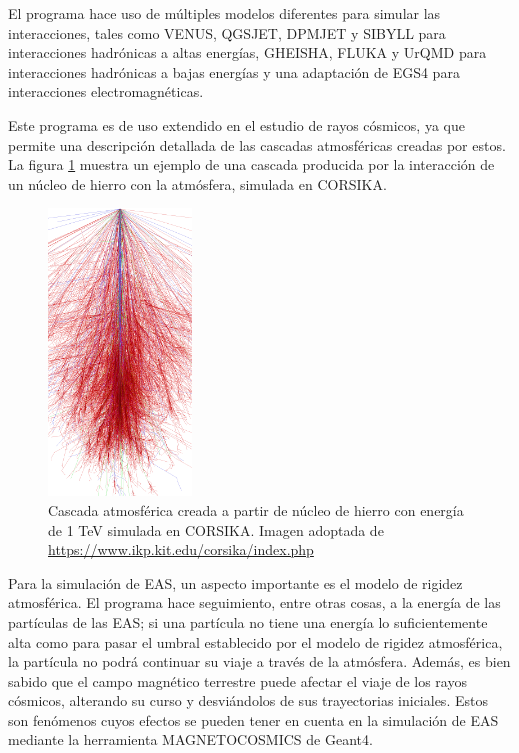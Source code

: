 \documentclass[12pt]{report}
\begin{document}
El programa hace uso de múltiples modelos diferentes para simular las interacciones, tales como VENUS, QGSJET, DPMJET y SIBYLL para interacciones hadrónicas a altas energías, GHEISHA, FLUKA y UrQMD para interacciones hadrónicas a bajas energías y una adaptación de EGS4 para interacciones electromagnéticas. \cite{heck1998corsika}

Este programa es de uso extendido en el estudio de rayos cósmicos, ya que permite una descripción detallada de las cascadas atmosféricas creadas por estos. La figura \ref{fig:ironcascade} muestra un ejemplo de una cascada producida por la interacción de un núcleo de hierro con la atmósfera, simulada en CORSIKA.

\begin{figure}
    \centering
    \includegraphics[width=1.5in]{images/ironcascade.png}
    \caption{Cascada atmosférica creada a partir de núcleo de hierro con energía de 1 TeV simulada en CORSIKA. Imagen adoptada de \url{https://www.ikp.kit.edu/corsika/index.php}}
    \label{fig:ironcascade}
\end{figure}

Para la simulación de EAS, un aspecto importante es el modelo de rigidez atmosférica. El programa hace seguimiento, entre otras cosas, a la energía de las partículas de las EAS; si una partícula no tiene una energía lo suficientemente alta como para pasar el umbral establecido por el modelo de rigidez atmosférica, la partícula no podrá continuar su viaje a través de la atmósfera. Además, es bien sabido que el campo magnético terrestre puede afectar el viaje de los rayos cósmicos, alterando su curso y desviándolos de sus trayectorias iniciales. Estos son fenómenos cuyos efectos se pueden tener en cuenta en la simulación de EAS mediante la herramienta MAGNETOCOSMICS de Geant4.
\end{document}
